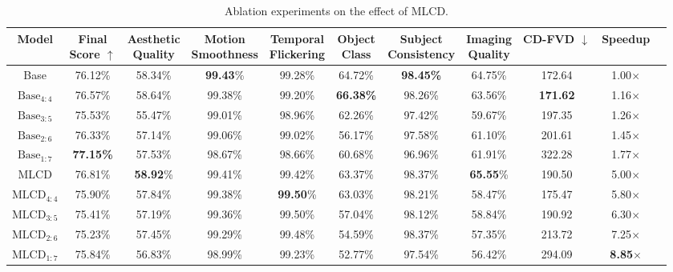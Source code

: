 \begin{table*}[ht]
\scriptsize \centering
\caption{Ablation experiments on the effect of MLCD.}
\label{tab:mlcd}
\setlength{\tabcolsep}{4pt}

\begin{tabular}{ccccccccccc}
\toprule 
\textbf{Model} & \makecell{\textbf{Final} \\ \textbf{Score}} $\uparrow$&  \makecell{\textbf{Aesthetic} \\ \textbf{Quality}} & \makecell{\textbf{Motion} \\ \textbf{Smoothness}} & \makecell{\textbf{Temporal} \\ \textbf{Flickering}} & \makecell{\textbf{Object} \\ \textbf{Class}} & \makecell{\textbf{Subject} \\ \textbf{Consistency}} & \makecell{\textbf{Imaging} \\ \textbf{Quality}} & \textbf{CD-FVD} $\downarrow$ & \textbf{Speedup} \\
 
\midrule
Base & 76.12\% & 58.34\% & \textbf{99.43}\% & 99.28\% & 64.72\% & \textbf{98.45\%} & 64.75\% & 172.64 & 1.00$\times$ \\ 
$\text{Base}_{4:4}$& 76.57\% & 58.64\% & 99.38\% & 99.20\% & \textbf{66.38\%} & 98.26\% & 63.56\% & \textbf{171.62} & 1.16$\times$ \\ 
$\text{Base}_{3:5}$ & 75.53\% & 55.47\% & 99.01\% & 98.96\% & 62.26\% & 97.42\% & 59.67\% & 197.35 & 1.26$\times$ \\ 
$\text{Base}_{2:6}$& 76.33\% & 57.14\% & 99.06\% & 99.02\% & 56.17\% & 97.58\% & 61.10\% & 201.61 & 1.45$\times$ \\ 
$\text{Base}_{1:7}$ & \textbf{77.15\%} & 57.53\% & 98.67\% & 98.66\% & 60.68\% & 96.96\% & 61.91\% & 322.28 & 1.77$\times$ \\ 
\midrule
MLCD & 76.81\% & \textbf{58.92}\% & 99.41\% & 99.42\% & 63.37\% & 98.37\% & \textbf{65.55}\%& 190.50 & 5.00$\times$ \\ 
$\text{MLCD}_{4:4}$ & 75.90\% & 57.84\% & 99.38\% & \textbf{99.50}\% & 63.03\% & 98.21\% & 58.47\%& 175.47 & 5.80$\times$ \\ 
$\text{MLCD}_{3:5}$  & 75.41\% & 57.19\% & 99.36\% & 99.50\% & 57.04\% & 98.12\% & 58.84\%& 190.92 & 6.30$\times$ \\ 
$\text{MLCD}_{2:6}$  & 75.23\% & 57.45\% & 99.29\% & 99.48\% & 54.59\% & 98.37\% & 57.35\%& 213.72 & 7.25$\times$ \\ 
$\text{MLCD}_{1:7}$  & 75.84\% & 56.83\% & 98.99\% & 99.23\% & 52.77\% & 97.54\% & 56.42\%& 294.09 & \textbf{8.85$\times$} \\ 
\bottomrule
\end{tabular}


\end{table*}
